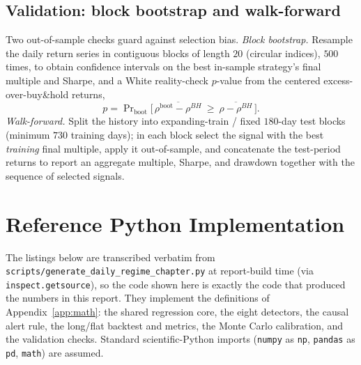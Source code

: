 \documentclass[11pt]{article}
\begin{document}
\subsection{Validation: block bootstrap and walk-forward}

Two out-of-sample checks guard against selection bias. \emph{Block bootstrap.} Resample the daily return series in contiguous blocks of length $20$ (circular indices), $500$ times, to obtain confidence intervals on the best in-sample strategy's final multiple and Sharpe, and a White reality-check $p$-value from the centered excess-over-buy\&hold returns,
\[
    p = \Pr\nolimits_{\text{boot}}\!\big[\, \overline{\rho^{\text{boot}}-\rho^{BH}} \ \ge\ \overline{\rho-\rho^{BH}} \,\big].
\]
\emph{Walk-forward.} Split the history into expanding-train / fixed $180$-day test blocks (minimum $730$ training days); in each block select the signal with the best \emph{training} final multiple, apply it out-of-sample, and concatenate the test-period returns to report an aggregate multiple, Sharpe, and drawdown together with the sequence of selected signals.

\section{Reference Python Implementation}\label{app:code}

The listings below are transcribed verbatim from \texttt{scripts/generate\_daily\_regime\_chapter.py} at report-build time (via \texttt{inspect.getsource}), so the code shown here is exactly the code that produced the numbers in this report. They implement the definitions of Appendix~\ref{app:math}: the shared regression core, the eight detectors, the causal alert rule, the long/flat backtest and metrics, the Monte Carlo calibration, and the validation checks. Standard scientific-Python imports (\texttt{numpy} as \texttt{np}, \texttt{pandas} as \texttt{pd}, \texttt{math}) are assumed.

\end{document}
